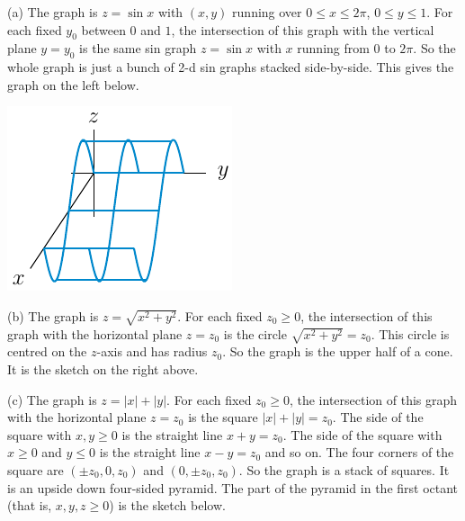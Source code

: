 \begin{solution} (a)
 The graph is $z=\sin x$ with $(x,y)$ running over
$0\le x\le 2\pi$,  $0\le y\le 1$. For each fixed $y_0$ between $0$ and $1$, 
the intersection of this graph with the vertical plane $y=y_0$ is the
same sin graph $z=\sin x$ with $x$ running from $0$ to $2\pi$. So the whole
graph is just a bunch of 2-d sin graphs stacked side-by-side. This gives
the graph on the left below.

\begin{center}
   \includegraphics[scale=1.05]{fig/sinGraph.pdf}\qquad\qquad
\end{center}

(b) 
The graph is $z=\sqrt{x^2+y^2}$. For each fixed $z_0\ge 0$, 
the intersection of this graph with the horizontal plane $z=z_0$ is the
circle $\sqrt{x^2+y^2}=z_0$. This circle is centred on the $z$-axis
and has radius $z_0$. So the graph is the upper half of a cone. It is the
sketch on the right above.

(c) 
The graph is $z=|x|+|y|$. For each fixed $z_0\ge 0$, 
the intersection of this graph with the horizontal plane $z=z_0$ is the
square $|x|+|y|=z_0$. The side of the square with $x,y\ge 0$ is the straight
line $x+y=z_0$. The side of the square with $x\ge 0$ and $y\le 0$ is 
the straight line $x-y=z_0$ and so on. The four corners of the square are
$(\pm z_0,0,z_0)$ and $(0, \pm z_0,z_0)$.  So the graph is a stack of squares.
It is an upside down four-sided pyramid. The part of the pyramid in the
first octant (that is, $x,y,z\ge 0$) is the sketch below.


\end{solution}
